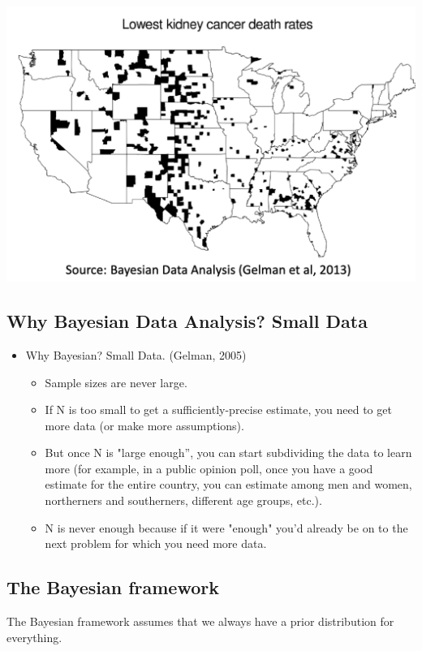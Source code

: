 \documentclass[11pt]{article}
\theoremstyle{definition}
\begin{document}
\includegraphics[width=\textwidth/2]{13.png}

\subsection{Why Bayesian Data Analysis? Small Data}

\begin{itemize}
    \item Why Bayesian? Small Data. (Gelman, 2005)
    \begin{itemize}
        \item Sample sizes are never large.
        \item If N is too small to get a sufficiently-precise estimate, you need to get more
        data (or make more assumptions).
        \item But once N is "large enough”, you can start subdividing the data to learn
        more (for example, in a public opinion poll, once you have a good estimate
        for the entire country, you can estimate among men and women,
        northerners and southerners, different age groups, etc.).
        \item N is never enough because if it were "enough" you'd already be on to the
        next problem for which you need more data.
    \end{itemize}
\end{itemize}

\subsection{The Bayesian framework}

The Bayesian framework assumes that we always have a prior
distribution for everything.
\end{document}
